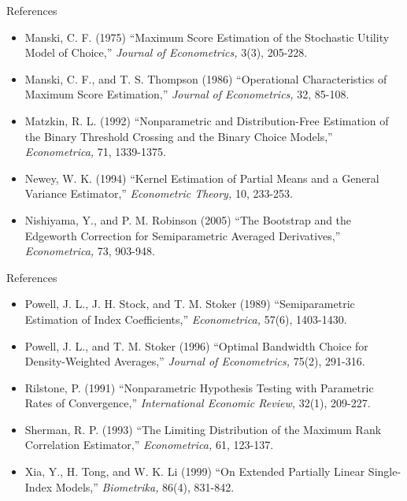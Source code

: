 \documentclass[xcolor=svgnames,dvipdfmx,cjk]{beamer}
\theoremstyle{example}
\begin{document}
\begin{frame}{References}
  \begin{itemize}
    \item Manski, C. F. (1975)
    ``Maximum Score Estimation of the Stochastic Utility Model of Choice,''
    \textit{Journal of Econometrics,} 3(3), 205-228.
\item Manski, C. F., and T. S. Thompson (1986)
    ``Operational Characteristics of Maximum Score Estimation,''
    \textit{Journal of Econometrics,} 32, 85-108.
\item Matzkin, R. L. (1992)
    ``Nonparametric and Distribution-Free Estimation of the Binary Threshold Crossing and the Binary Choice Models,''
    \textit{Econometrica,} 71, 1339-1375.
\item Newey, W. K. (1994)
  ``Kernel Estimation of Partial Means and a General Variance Estimator,''
  \textit{Econometric Theory,} 10, 233-253.
\item Nishiyama, Y., and P. M. Robinson (2005)
  ``The Bootstrap and the Edgeworth Correction for Semiparametric Averaged Derivatives,''
  \textit{Econometrica,} 73, 903-948.
  \end{itemize}
\end{frame}

\begin{frame}{References}
\begin{itemize}
  \item Powell, J. L., J. H. Stock, and T. M. Stoker (1989)
    ``Semiparametric Estimation of Index Coefficients,''
    \textit{Econometrica,} 57(6), 1403-1430. 
\item Powell, J. L., and T. M. Stoker (1996)
    ``Optimal Bandwidth Choice for Density-Weighted Averages,''
    \textit{Journal of Econometrics,} 75(2), 291-316.
\item Rilstone, P. (1991)
    ``Nonparametric Hypothesis Testing with Parametric Rates of Convergence,''
    \textit{International Economic Review,} 32(1), 209-227.
\item Sherman, R. P. (1993)
    ``The Limiting Distribution of the Maximum Rank Correlation Estimator,''
    \textit{Econometrica,} 61, 123-137.
\item Xia, Y., H. Tong, and W. K. Li (1999)
    ``On Extended Partially Linear Single-Index Models,''
    \textit{Biometrika,} 86(4), 831-842.
\end{itemize} 
\end{frame}
\end{document}
